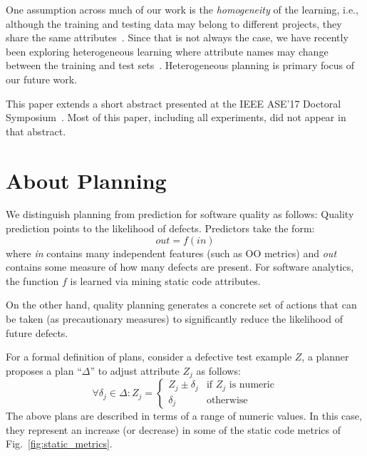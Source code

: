 \documentclass[10pt, journal, compsoc]{IEEEtran}
\newcommand{\fig}[1]{Fig.~\ref{fig:#1}}
\begin{document}
One assumption across much of our work is the \textit{homogeneity} of the learning, i.e., although the training and testing data may belong to different projects, they share the same attributes~\cite{krishna16, krishna17a, krishna17b, menzies07, turhan09}. Since that is not always the case, we have recently been exploring heterogeneous learning where attribute names may change between the training and test sets~\cite{fu18}. Heterogeneous planning is primary focus of our future work.

This paper extends a short  abstract presented at the IEEE ASE'17 Doctoral Symposium~\cite{krishna2017b}. Most of this paper, including all experiments, did not appear in that abstract.



\section{About Planning}
\label{sect:motivate}

We distinguish planning from prediction for software quality as follows: 
Quality prediction points to the likelihood of defects. Predictors take the form:
\begin{equation*}
  out = f(in)  
\end{equation*}
where {\em in} contains many independent features (such as OO metrics) and {\em out} contains some measure of
how many defects are present. For software analytics, the function $f$ is learned via mining static code attributes.




On the other hand, quality planning generates a concrete set of actions that can be taken (as precautionary measures) to significantly reduce the likelihood of future defects.

For a formal definition of plans, consider a defective test example $Z$, a planner
proposes a plan ``$\Delta$'' to adjust attribute $Z_j$ as follows:
{\small\[
\forall \delta_j \in \Delta : Z_j = 
\begin{cases}
   Z_j \pm \delta_j& \text{if $Z_j$ is numeric}\\
  \delta_j       & \text{otherwise}
\end{cases}
\]}
The above plans are described in terms of a range of numeric values. In this case, they represent an increase (or decrease) in some of the static code metrics of \fig{static_metrics}.
\end{document}
